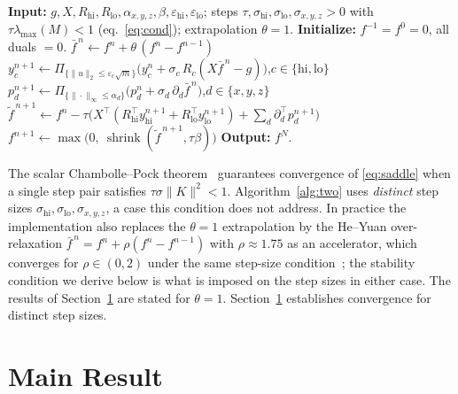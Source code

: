 \documentclass{article}
\begin{document}
\begin{algorithm}[t]
\caption{Preconditioned PDHG with split low/high fidelity channels}
\label{alg:two}
\begin{algorithmic}[1]
\State \textbf{Input:} $g,X,R_{\mathrm{hi}},R_{\mathrm{lo}},\alpha_{x,y,z},\beta,\varepsilon_{\mathrm{hi}},\varepsilon_{\mathrm{lo}}$; steps $\tau,\sigma_{\mathrm{hi}},\sigma_{\mathrm{lo}},\sigma_{x,y,z}>0$ with $\tau\lambda_{\max}(M)<1$ (eq.~\eqref{eq:cond}); extrapolation $\theta=1$.
\State \textbf{Initialize:} $f^{-1}=f^{0}=0$, all duals $=0$.
  \State $\bar f^{\,n}\gets f^{n}+\theta\,(f^{n}-f^{n-1})$ 
  \State $y_{c}^{n+1}\gets \Pi_{\{\|u\|_2\le\varepsilon_c\sqrt m\}}\!\big(y_{c}^{n}+\sigma_{c}\,R_{c}(X\bar f^{\,n}-g)\big)$,\quad $c\in\{\mathrm{hi},\mathrm{lo}\}$
  \State $p_{d}^{n+1}\gets \Pi_{\{\|\cdot\|_\infty\le\alpha_d\}}\!\big(p_{d}^{n}+\sigma_{d}\,\partial_d\bar f^{\,n}\big)$,\quad $d\in\{x,y,z\}$
  \State $\tilde f^{\,n+1}\gets f^{n}-\tau\big(X^\top(R_{\mathrm{hi}}^\top y_{\mathrm{hi}}^{n+1}+R_{\mathrm{lo}}^\top y_{\mathrm{lo}}^{n+1})+\sum_d\partial_d^\top p_d^{n+1}\big)$
  \State $f^{n+1}\gets \max\!\big(0,\ \operatorname{shrink}(\tilde f^{\,n+1},\tau\beta)\big)$
\EndFor
\State \textbf{Output:} $f^{N}$.
\end{algorithmic}
\end{algorithm}

The scalar Chambolle--Pock theorem~\citep{chambolle2011first} guarantees convergence of \eqref{eq:saddle} when a single step pair satisfies $\tau\sigma\|K\|^2<1$. Algorithm~\ref{alg:two} uses \emph{distinct} step sizes $\sigma_{\mathrm{hi}},\sigma_{\mathrm{lo}},\sigma_{x,y,z}$, a case this condition does not address. In practice the implementation also replaces the $\theta=1$ extrapolation by the He--Yuan over-relaxation $\bar f^{\,n}=f^n+\rho(f^n-f^{n-1})$ with $\rho\approx1.75$ as an accelerator, which converges for $\rho\in(0,2)$ under the same step-size condition~\citep{he2012convergence}; the stability condition we derive below is what is imposed on the step sizes in either case. The results of Section~\ref{sec:main} are stated for $\theta=1$. Section~\ref{sec:main} establishes convergence for distinct step sizes.

\section{Main Result}
\label{sec:main}
\end{document}
